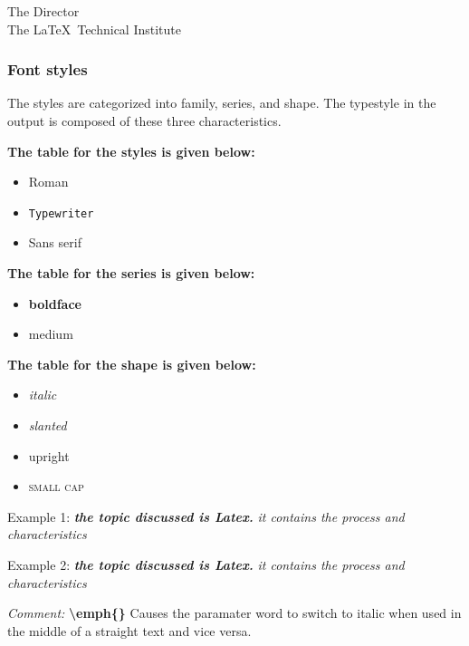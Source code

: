 \documentclass[11pt,a4paper]{report}
\theoremstyle{remark}
\theoremstyle{definition}
\begin{document}
			\begin{flushright}  
				\textsf{The Director}\\  
				The \LaTeX\ Technical Institute  
			\end{flushright} %
		
		\subsubsection*{Font styles}
			
			The styles are categorized into family, series, and shape. The typestyle in the output is composed of these three characteristics.
			
			\begin{minipage}{0.5\textwidth}
				\textbf{The table for the styles is given below:}
				\begin{itemize}
					\item \textrm{Roman}
					\item \texttt{Typewriter}
					\item \textsf{Sans serif}
				\end{itemize}
				\textbf{The table for the series is given below:}
				\begin{itemize}
					\item \textbf{boldface}
					\item \textmd{medium}
				\end{itemize}
			\end{minipage}
			\begin{minipage}{0.5\textwidth}
				\textbf{The table for the shape is given below:}
				\begin{itemize}
					\item \textit{italic}
					\item \textsl{slanted}
					\item \textup{upright}
					\item \textsc{small cap}
				\end{itemize}
			\end{minipage}
			
			\noindent
			Example 1:
			\textit{\textbf{ the topic discussed is Latex.}}  
			\textrm{\textsl{ it contains the process and characteristics}}
			
			\noindent
			Example 2:
			\textit{\textbf{ the topic discussed is Latex.}\newline}  
			\textrm{\textsl{ it contains the process and characteristics}}  
			
			\noindent
			\textit{Comment:} \quad \textbf{\textbackslash emph\{\}} Causes the paramater word to switch to italic when used in the middle of a straight text and vice versa.
			
\end{document}
